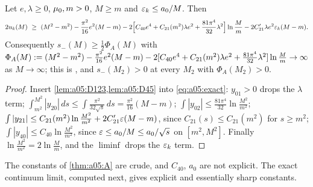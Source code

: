 \begin{theorem}\label{thm:a05:A}
Let $e,\lambda\ge0$, $\mu_0,m>0$, $M\ge m$ and $\varepsilon_k\le a_0/M$. Then
\[
2u_k(M)\ \ge\ (M^2-m^2)-\frac{\pi^2}{16}e^2(M-m)-2\Big[C_{40}e^4+C_{21}(m^2)\lambda e^2+\frac{81\pi^4}{32}\lambda^2\Big]\ln\frac Mm-2C'_{21}\lambda e^2\eps_k(M-m).
\]
Consequently $s_-(M)\ge\frac12\Phi_A(M)$ with $\Phi_A(M):=(M^2-m^2)-\frac{\pi^2}{16}e^2(M-m)-2[C_{40}e^4+C_{21}(m^2)\lambda e^2+\frac{81\pi^4}{32}\lambda^2]\ln\frac Mm\to\infty$ as $M\to\infty$; this is \NEGinf, and $s_-(M_2)>0$ at every $M_2$ with $\Phi_A(M_2)>0$.
\end{theorem}
\begin{proof}
Insert \cref{lem:a05:D123,lem:a05:D45} into \eqref{eq:a05:exact}: $y_{01}>0$ drops the $\lambda$ term; $\int_{m^2}^{M^2}|y_{20}|\,ds\le\int\frac{\pi^2}{32\sqrt s}\,ds=\frac{\pi^2}{16}(M-m)$; $\int|y_{02}|\le\frac{81\pi^4}{32}\ln\frac{M^2}{m^2}$; $\int|y_{21}|\le C_{21}(m^2)\ln\frac{M^2}{m^2}+2C'_{21}\varepsilon(M-m)$, since $C_{21}(s)\le C_{21}(m^2)$ for $s\ge m^2$; $\int|y_{40}|\le C_{40}\ln\frac{M^2}{m^2}$, since $\varepsilon\le a_0/M\le a_0/\sqrt s$ on $[m^2,M^2]$. Finally $\ln\frac{M^2}{m^2}=2\ln\frac Mm$, and the $\liminf$ drops the $\varepsilon_k$ term.
\end{proof}
The constants of \cref{thm:a05:A} are crude, and $C_{40}$, $a_0$ are not explicit. The exact continuum limit, computed next, gives explicit and essentially sharp constants.

